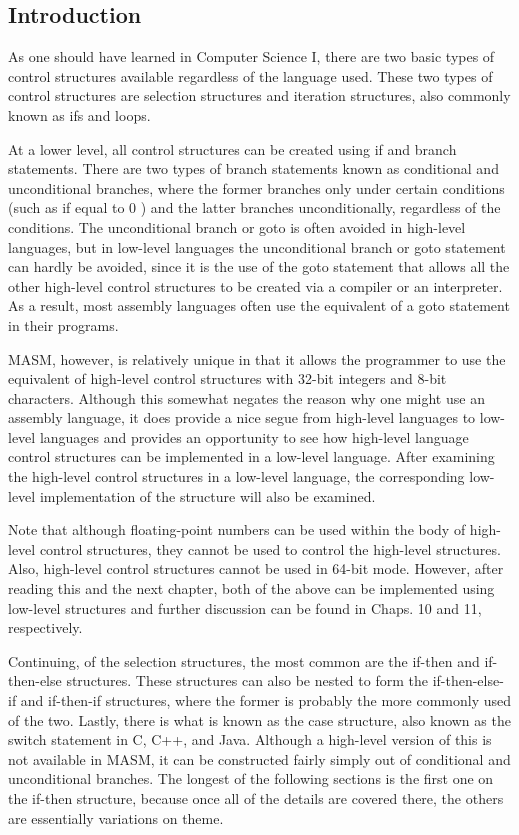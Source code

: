 \documentclass[10pt]{article}
\begin{document}
\subsection*{Introduction}
As one should have learned in Computer Science I, there are two basic types of control structures available regardless of the language used. These two types of control structures are selection structures and iteration structures, also commonly known as ifs and loops.

At a lower level, all control structures can be created using if and branch statements. There are two types of branch statements known as conditional and unconditional branches, where the former branches only under certain conditions (such as if equal to 0 ) and the latter branches unconditionally, regardless of the conditions. The unconditional branch or goto is often avoided in high-level languages, but in low-level languages the unconditional branch or goto statement can hardly be avoided, since it is the use of the goto statement that allows all the other high-level control structures to be created via a compiler or an interpreter. As a result, most assembly languages often use the equivalent of a goto statement in their programs.

MASM, however, is relatively unique in that it allows the programmer to use the equivalent of high-level control structures with 32-bit integers and 8-bit characters. Although this somewhat negates the reason why one might use an assembly language, it does provide a nice segue from high-level languages to low-level languages and provides an opportunity to see how high-level language control structures can be implemented in a low-level language. After examining the high-level control structures in a low-level language, the corresponding low-level implementation of the structure will also be examined.

Note that although floating-point numbers can be used within the body of high-level control structures, they cannot be used to control the high-level structures. Also, high-level control structures cannot be used in 64-bit mode. However, after reading this and the next chapter, both of the above can be implemented using low-level structures and further discussion can be found in Chaps. 10 and 11, respectively.

Continuing, of the selection structures, the most common are the if-then and if-then-else structures. These structures can also be nested to form the if-then-else-if and if-then-if structures, where the former is probably the more commonly used of the two. Lastly, there is what is known as the case structure, also known as the switch statement in C, C++, and Java. Although a high-level version of this is not available in MASM, it can be constructed fairly simply out of conditional and unconditional branches. The longest of the following sections is the first one on the if-then structure, because once all of the details are covered there, the others are essentially variations on theme.
\end{document}
